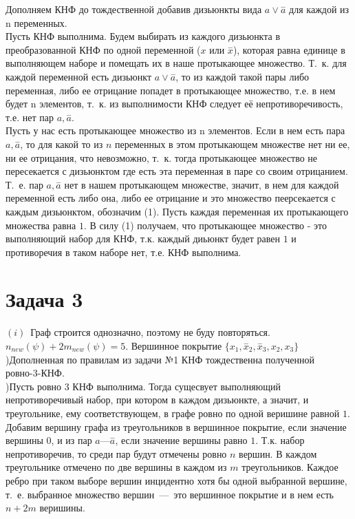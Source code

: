 \documentclass[a4paper,12pt]{article} %
\begin{document}
Дополняем КНФ до тождественной добавив дизьюнкты вида $a\vee \overset{-}a$ для каждой из n переменных.\\ 

Пусть КНФ выполнима. 
Будем выбирать из каждого дизьюнкта в преобразованной КНФ по одной переменной ($x$ или $\overset{-}x$), которая равна единице в выполняющем наборе и помещать их в наше протыкающее множество. Т.~к. для каждой переменной  есть дизьюнкт $a\vee \overset{-}a$, то из каждой такой пары либо переменная, либо ее отрицание попадет в протыкающее множество, т.е. в нем будет n элементов, т.~к. из выполнимости КНФ следует её непротиворечивость, т.е. нет пар $a, \overset{-}a$. \\

Пусть у нас есть протыкающее множество из n элементов. Если в нем есть пара $a, \overset{-}a$, то для какой то из $n$ переменных в этом протыкающем множестве нет ни ее, ни ее отрицания, что невозможно, т.~к. тогда протыкающее множество не пересекается с дизьюнктом где есть эта переменная в паре со своим отрицанием.  Т.~е. пар $a, \overset{-}a$ нет в нашем протыкающем множестве, значит, в нем для каждой переменной есть либо она, либо ее отрицание и это множество пеерсекается с каждым дизьюнктом, обозначим (1). Пусть каждая переменная их протыкающего множества равна $1$. В силу (1) получаем, что протыкающее множество - это выполняющий набор для КНФ, т.к. каждый диьюнкт будет равен $1$ и противоречия в таком наборе нет, т.е. КНФ выполнима.\\


\section*{Задача 3}
$(i)$~Граф строится однозначно, поэтому не буду повторяться. $n_{new}(\psi)+2m_{new}(\psi) = 5$. Вершинное покрытие $\{x_1,  \overset{-}x_2, \overset{-}x_3, x_2, x_3\}$\\

)Дополненная по правилам из задачи №1 КНФ тождественна полученной ровно-3-КНФ.\\
 
)Пусть ровно 3 КНФ выполнима. Тогда сущесвует выполняющий непротиворечивый набор, при котором в каждом дизьюнкте, а значит, и треугольнике, ему соответствующем, в графе ровно по одной веришине равной $1$. Добавим вершину графа из треугольников в вершинное покрытие, если значение вершины $0$, и из пар $a\text{---}\overset{-}a$, если значение вершины равно $1$. Т.к. набор непротиворечив, то среди пар будут отмечены ровно $n$ вершин. В каждом треугольнике отмечено по две вершины в каждом из $m$ треугольников. Каждое ребро при таком выборе вершин инцидентно хотя бы одной  
выбранной вершине, т.~е. выбранное множество вершин~---~это вершинное покрытие и в нем есть $n+2m$ веришины.\\
\end{document}
